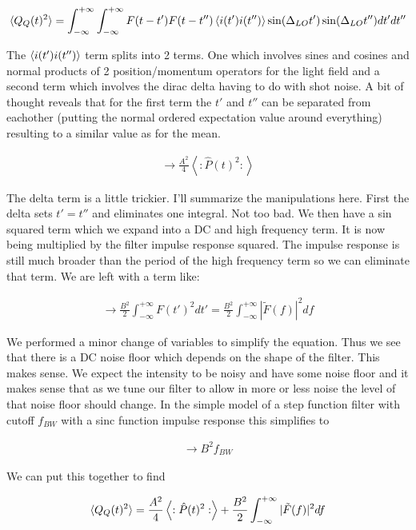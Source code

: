 \documentclass[12pt]{article}
\begin{document}
\begin{align}
\braket{Q_Q(t)^2} = \int_{-\infty}^{+\infty}\int_{-\infty}^{+\infty}F(t-t')F(t-t'')\braket{i(t')i(t'')}\sin(\Delta_{LO}t')\sin(\Delta_{LO}t'')dt'dt''
\end{align}

The $\braket{i(t')i(t'')}$ term splits into 2 terms. One which involves sines and cosines and normal products of 2 position/momentum operators  for the light field and a second term which involves the dirac delta having to do with shot noise. A bit of thought reveals that for the first term the $t'$ and $t''$ can be separated from eachother (putting the normal ordered expectation value around everything) resulting to a similar value as for the mean.

\begin{align}
\rightarrow \frac{A^2}{4}\left<:\hat{P}(t)^2:\right>
\end{align}

The delta term is a little trickier. I'll summarize the manipulations here. First the delta sets $t'=t''$ and eliminates one integral. Not too bad. We then have a sin squared term which we expand into a DC and high frequency term. It is now being multiplied by the filter impulse response squared. The impulse response is still much broader than the period of the high frequency term so we can eliminate that term. We are left with a term like:

\begin{align}
\rightarrow \frac{B^2}{2}\int_{-\infty}^{+\infty}F(t')^2 dt' = \frac{B^2}{2}\int_{-\infty}^{+\infty} |\tilde{F}(f)|^2 df
\end{align}

We performed a minor change of variables to simplify the equation. Thus we see that there is a DC noise floor which depends on the shape of the filter. This makes sense. We expect the intensity to be noisy and have some noise floor and it makes sense that as we tune our filter to allow in more or less noise the level of that noise floor should change. In the simple model of a step function filter with cutoff $f_{BW}$ with a sinc function impulse response this simplifies to

\begin{align}
\rightarrow B^2 f_{BW}
\end{align}

We can put this together to find

\begin{align}
\braket{Q_Q(t)^2} = \frac{A^2}{4}\left<:\hat{P}(t)^2:\right> + \frac{B^2}{2}\int_{-\infty}^{+\infty}|\tilde{F}(f)|^2 df
\end{align}
\end{document}
